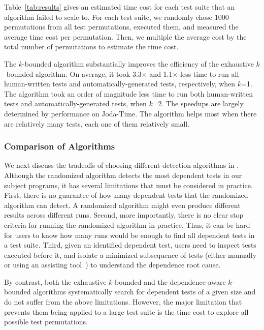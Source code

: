 Table~\ref{tab:results} gives an estimated time cost for each
test suite that an algorithm failed to scale to. For each test suite,
we randomly chose 1000 permutations from all
test permutations, executed them, and measured the average time cost
per permutation. Then, we multiple
the average cost by the total number of permutations to estimate
the time cost.

The \dependenceaware{} $k$-bounded algorithm substantially improves
the efficiency of the exhaustive $k$-bounded algorithm. On average,
it took 3.3$\times$ and 1.1$\times$ less time to run all
human-written tests and automatically-generated tests, respectively, when $k$=1.
The \dependenceaware{} algorithm took an order of magnitude
less time to run both human-written tests and automatically-generated tests,
when $k$=2.
The speedups are largely determined by performance on Joda-Time.
The \dependenceaware{} algorithm helps most when there are relatively many
tests, each one of them relatively small.




\subsubsection{Comparison of Algorithms}
\label{sec:algcomparison}

We next discuss the tradeoffs of choosing different detection
algorithms in \ourtool. Although the randomized algorithm
detects the most dependent tests in our subject programs,
it has several limitations that must be considered
in practice. First, there is no guarantee of how many
dependent tests that the randomized algorithm can detect. A randomized
algorithm might even produce different results across different runs.
Second, more importantly, there is no clear stop criteria
for running the randomized algorithm in practice.
Thus, it can be hard for users
to know how many runs would be enough to find all dependent tests in a test suite.
Third, given an identified dependent test, users
need to inspect tests executed before it, and isolate a minimized
subsequence of tests (either
manually or using an assisting tool~\cite{Zeller:2002}) to understand the dependence root cause.

By contrast, both the exhaustive $k$-bounded and the depend\-ence-aware
$k$-bounded algorithms systematically search for dependent
tests of a given size and do not suffer from the above limitations.
However, the major limitation that prevents them being applied to a
large test suite is the time cost to
explore all possible test permutations.


